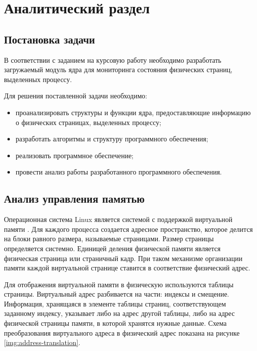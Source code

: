 \chapter{Аналитический раздел}

\section{Постановка задачи}

В соответствии с заданием на курсовую работу необходимо разработать загружаемый модуль ядра для мониторинга состояния физических страниц, выделенных процессу.

Для решения поставленной задачи необходимо:

\begin{itemize}
	\item проанализировать структуры и функции ядра, предоставляющие информацию о физических страницах, выделенных процессу;
	\item разработать алгоритмы и структуру программного обеспечения;
	\item реализовать программное обеспечение;
	\item провести анализ работы разработанного программного обеспечения.
\end{itemize}

\section{Анализ управления памятью}

Операционная система Linux является системой с поддержкой виртуальной памяти \cite{love}. Для каждого процесса создается адресное пространство, которое делится на блоки равного размера, называемые страницами. Размер страницы определяется системно. Единицей деления физической памяти является физическая страница или страничный кадр. При таком механизме организации памяти каждой виртуальной странице ставится в соответствие физический адрес.

Для отображения виртуальной памяти в физическую используются таблицы страницы. Виртуальный адрес разбивается на части: индексы и смещение. Информация, хранящаяся в элементе таблицы страниц, соответствующем заданному индексу, указывает либо на адрес другой таблицы,  либо на адрес физической страницы памяти, в которой хранятся нужные данные. Схема преобразования виртуального адреса в физический адрес показана на рисунке \ref{img:address-translation}.

